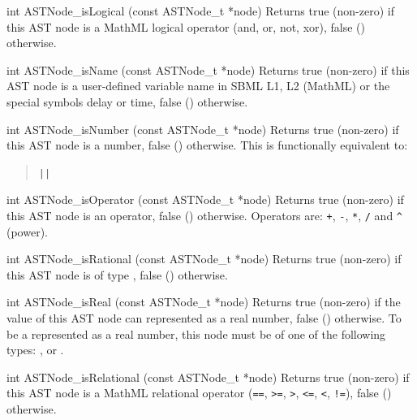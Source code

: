 \documentclass{sbmlmanual}
\begin{document}
\begin{methoddef}{int ASTNode\_isLogical (const ASTNode\_t *node)}
  Returns true (non-zero) if this AST node is a MathML logical operator
  (and, or, not, xor), false () otherwise.
\end{methoddef}


\begin{methoddef}{int ASTNode\_isName (const ASTNode\_t *node)}
  Returns true (non-zero) if this AST node is a user-defined variable name
  in SBML L1, L2 (MathML) or the special symbols delay or time, false ()
  otherwise.
\end{methoddef}


\begin{methoddef}{int ASTNode\_isNumber (const ASTNode\_t *node)}
  Returns true (non-zero) if this AST node is a number, false ()
  otherwise.  This is functionally equivalent to:
  \begin{quote}
     \verb+||+ 
  \end{quote}
\end{methoddef}


\begin{methoddef}{int ASTNode\_isOperator (const ASTNode\_t *node)}
  Returns true (non-zero) if this AST node is an operator, false ()
  otherwise.  Operators are: \verb|+|, \verb|-|, \verb|*|, \verb|/| and
  \verb|^| (power).
\end{methoddef}


\begin{methoddef}{int ASTNode\_isRational (const ASTNode\_t *node)}
  Returns true (non-zero) if this AST node is of type
  , false () otherwise.
\end{methoddef}


\begin{methoddef}{int ASTNode\_isReal (const ASTNode\_t *node)}
  Returns true (non-zero) if the value of this AST node can represented as
  a real number, false () otherwise. 
  To be a represented as a real number, this node must be of one of the
  following types: ,  or
  .
\end{methoddef}


\begin{methoddef}{int ASTNode\_isRelational (const ASTNode\_t *node)}
  Returns true (non-zero) if this AST node is a MathML relational operator
  (\verb|==|, \verb|>=|, \verb|>|, \verb|<=|, \verb|<|, \verb|!=|), false
  () otherwise.
\end{methoddef}
\end{document}
